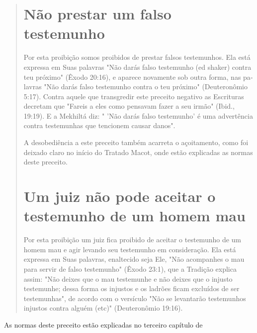 \begin{quote}
\section{Não prestar um falso testemunho}

Por esta proibição somos proibidos de prestar falsos testemunhos. Ela
está expressa em Suas palavras "Não darás falso testemunho (ed shaker)
con­tra teu próximo" (Êxodo 20:16), e aparece novamente sob outra forma,
nas pa­lavras "Não darás falso testemunho contra o teu próximo"
(Deuteronômio 5:17). Contra aquele que transgredir este preceito
negativo as Escrituras decretam que "Fareis a eles como pensavam fazer a
seu irmão" (Ibid., 19:19). E a Mekhiltá diz: " 'Não darás falso
testemunho' é uma advertência contra testemunhas que tencionem causar
danos".

A desobediência a este preceito também acarreta o açoitamento, co­mo foi
deixado claro no início do Tratado Macot, onde estão explicadas as
nor­mas deste preceito.

\section{Um juiz não pode aceitar o testemunho de um homem mau}

Por esta proibição um juiz fica proibido de aceitar o testemunho de um
homem mau e agir levando seu testemunho em consideração. Ela está
expressa em Suas palavras, enaltecido seja Ele, "Não acompanhes o mau
para servir de fal­so testemunho" (Êxodo 23:1), que a Tradição explica
assim: "Não deixes que o mau testemunhe e não deixes que o injusto
testemunhe; dessa forma os injustos e os ladrões ficam excluídos de ser
testemunhas", de acordo com o versículo "Não se levantarão testemunhos
injustos contra alguém (etc)" (Deuteronômio 19:16).
\end{quote}

As normas deste preceito estão explicadas no terceiro capítulo de

